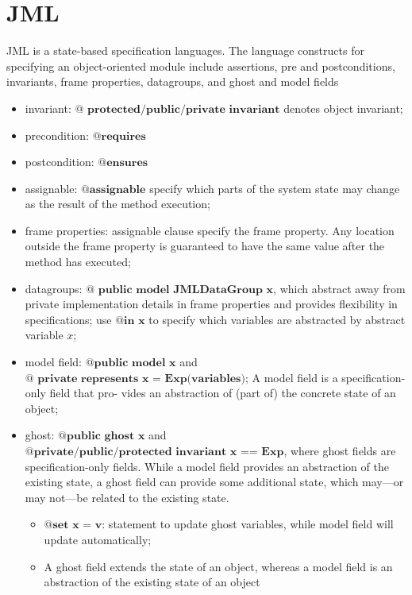 \section{JML}
JML \cite{Patrice:06, Lilian:04} is a state-based specification languages. 
The language constructs for specifying an object-oriented module
include assertions, pre and postconditions, invariants, frame properties,
datagroups, and ghost and model fields
\begin{itemize}
  \item invariant: $\textbf{@ protected/public/private invariant}$ denotes
  object invariant;
  \item precondition: $\textbf{@requires}$
  \item postcondition: $\textbf{@ensures}$
  \item assignable: $\textbf{@assignable}$ specify which parts of the system
  state may change as the result of the method execution;
  \item frame properties: assignable clause specify the frame property.
  Any location outside the frame property is guaranteed to have the same value
  after the method has executed;
  \item datagroups: $\textbf{@ public model JMLDataGroup x}$, which abstract
  away from private implementation details in frame properties and provides flexibility in
  specifications; use $\textbf{@in x}$ to specify which variables are abstracted
  by abstract variable $x$;
  \item model field: $\textbf{@public model x}$ and $\textbf{@ private
  represents x = Exp(variables);}$ A model field is a specification-only field
  that pro- vides an abstraction of (part of) the concrete state of an object;
  \item ghost: $\textbf{@public ghost x}$ and $\textbf{@private/public/protected
  invariant x == Exp}$, where ghost fields are specification-only fields. While
  a model field provides an abstraction of the existing state, a ghost field can
  provide some additional state, which may—or may not—be related to the existing state.
    \begin{itemize}
      \item $\textbf{@set x = v}$: statement to update ghost variables, while
      model field will update automatically;
      \item A ghost field extends the state of an object, whereas a model field
      is an abstraction of the existing state of an object
    \end{itemize}

\end{itemize}
